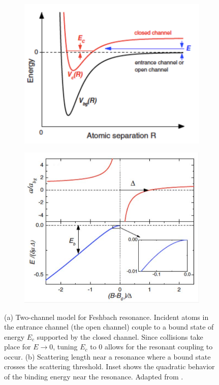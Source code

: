 \documentclass[prl,onecolumn,amsmath,amssymb,titlepage,nofootinbib,preprint]{revtex4-1}
\begin{document}
	\begin{figure}
		\centering
		\begin{subfigure}[b]{0.45\textwidth}
			\caption{}
			\includegraphics[width=\textwidth]{Figures/channels_defined}
			\label{fig:channel_defined}
		\end{subfigure}
		\begin{subfigure}[b]{0.45\textwidth}
			\caption{}
			\includegraphics[width=\textwidth]{Figures/Resonances}
			\label{fig:resonance}
		\end{subfigure}
		\caption{(a) Two-channel model for Feshbach resonance.  Incident atoms in the entrance channel (the open channel) couple to a bound state of energy $E_{c}$ supported by the closed channel.  Since collisions take place for $E\rightarrow 0$, tuning $E_{c}$ to 0 allows for the resonant coupling to occur. (b) Scattering length near a resonance where a bound state crosses the scattering threshold. Inset shows the quadratic behavior of the binding energy near the resonance.  Adapted from \cite{Chin2010}.}
	\end{figure}
	
\end{document}
